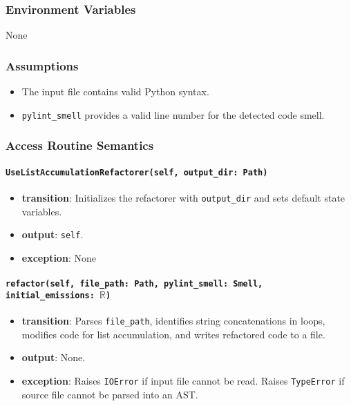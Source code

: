 \documentclass[12pt, titlepage]{article}
\begin{document}
\subsubsection{Environment Variables}
None
  
\subsubsection{Assumptions}
\begin{itemize}
  \item The input file contains valid Python syntax.
  \item \texttt{pylint\_smell} provides a valid line number for the detected code smell.
\end{itemize}
  
\subsubsection{Access Routine Semantics}
  
\paragraph{\texttt{UseListAccumulationRefactorer(self, output\_dir: Path)}}
\begin{itemize}
  \item \textbf{transition}: Initializes the refactorer with \texttt{output\_dir} and sets default state variables.
  \item \textbf{output}: \texttt{self}.
  \item \textbf{exception}: None
\end{itemize}
  
\paragraph{\texttt{refactor(self, file\_path: Path, pylint\_smell: Smell, initial\_emissions: $\mathbb{R}$)}}
\begin{itemize}
  \item \textbf{transition}: Parses \texttt{file\_path}, identifies string concatenations in loops, modifies code for list accumulation, and writes refactored code to a file.
  \item \textbf{output}: None.
  \item \textbf{exception}: Raises \texttt{IOError} if input file cannot be read. Raises \texttt{TypeError} if source file cannot be parsed into an AST.
\end{itemize}
\end{document}
